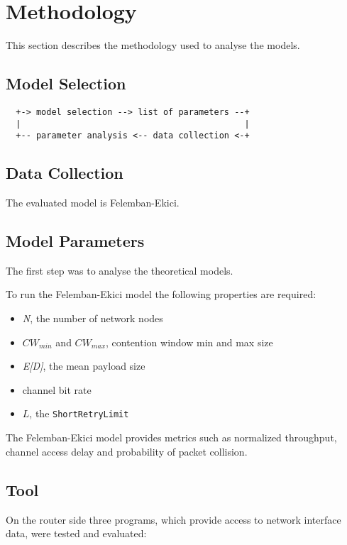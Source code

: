 \chapter{Methodology}

This section describes the methodology used to analyse the models.

\section{Model Selection}

\begin{verbatim}
  +-> model selection --> list of parameters --+
  |                                            |
  +-- parameter analysis <-- data collection <-+
\end{verbatim}
 
\section{Data Collection}

The evaluated model is Felemban-Ekici.

\section{Model Parameters}
The first step was to analyse the theoretical models.

To run the Felemban-Ekici model the following properties are required:

\begin{itemize}
	\item \emph{N}, the number of network nodes
	\item $CW_{min}$ and $CW_{max}$, contention window min and max size
	\item \emph{E[D]}, the mean payload size
	\item channel bit rate
	\item $L$, the \texttt{ShortRetryLimit}
\end{itemize}

The Felemban-Ekici model provides metrics such as normalized throughput, channel access delay and probability of packet collision.

\section{Tool}

On the router side three programs, which provide access to network interface data, were tested and evaluated:

